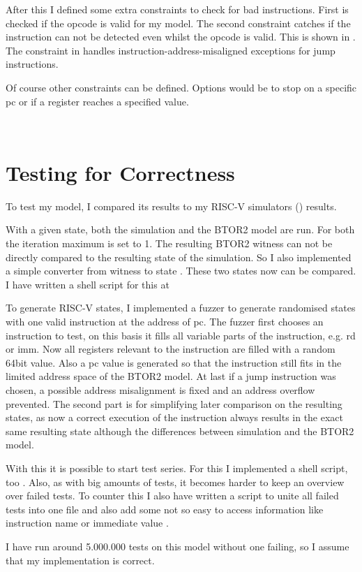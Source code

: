 After this I defined some extra constraints to check for bad
instructions. First is checked if the opcode is valid for my model.
The second constraint catches if the instruction can not be detected
even whilst the opcode is valid. This is shown in
. The constraint in 
handles instruction-address-misaligned exceptions for jump
instructions.

Of course other constraints can be defined. Options would be to stop
on a specific pc or if a register reaches a specified value.

\\ 





\section{Testing for Correctness}\label{sec:corectness}
To test my model, I compared its results to my RISC-V simulators
() results.

With a given state, both the simulation and the BTOR2 model are run.
For both the iteration maximum is set to 1. The resulting BTOR2
witness can not be directly compared to the resulting state of the
simulation. So I also implemented a simple converter from witness to
state \cite[src/restate\_witness.c]{repoRV2BTOR}. These two states
now can be compared. I have written a shell script for this at
\cite[sh\_utils/compare\_iterations.sh]{repoRV2BTOR}

To generate RISC-V states, I implemented a fuzzer
\cite[src/state\_fuzzer.c]{repoRV2BTOR} to generate randomised states
with one valid instruction at the address of pc. The fuzzer first
chooses an instruction to test, on this basis it fills all variable
parts of the instruction, e.g. rd or imm. Now all registers relevant
to the instruction are filled with a random 64bit value. Also a pc
value is generated so that the instruction still fits in the limited
address space of the BTOR2 model. At last if a jump instruction was
chosen, a possible address misalignment is fixed and an address
overflow prevented. The second part is for simplifying later
comparison on the resulting states, as now a correct execution of the
instruction always results in the exact same resulting state although
the differences between simulation and the BTOR2 model.

With this it is possible to start test series. For this I implemented
a shell script, too
\cite[sh\_utils/test\_btor2\_model.sh]{repoRV2BTOR}. Also, as with
big amounts of tests, it becomes harder to keep an overview over
failed tests. To counter this I also have written a script to unite
all failed tests into one file and also add some not so easy to
access information like instruction name or immediate value
\cite[sh\_utils/diff\_logger.sh]{repoRV2BTOR}.

I have run around 5.000.000 tests on this model without one failing,
so I assume that my implementation is correct.
